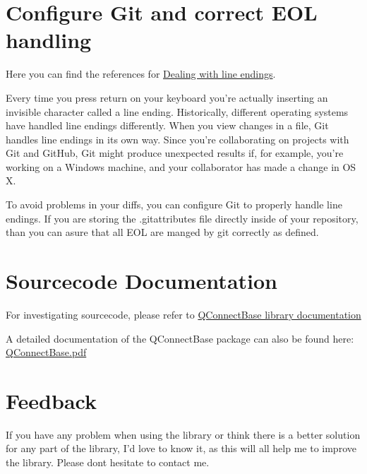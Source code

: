 \hypertarget{description-configure-git-and-correct-eol-handling}{%
\section{Configure Git and correct EOL
handling}\label{description-configure-git-and-correct-eol-handling}}

Here you can find the references for
\href{https://help.github.com/articles/dealing-with-line-endings/}{Dealing
with line endings}.

Every time you press return on your keyboard you're actually inserting
an invisible character called a line ending. Historically, different
operating systems have handled line endings differently. When you view
changes in a file, Git handles line endings in its own way. Since you're
collaborating on projects with Git and GitHub, Git might produce
unexpected results if, for example, you're working on a Windows machine,
and your collaborator has made a change in OS X.

To avoid problems in your diffs, you can configure Git to properly
handle line endings. If you are storing the .gitattributes file directly
inside of your repository, than you can asure that all EOL are manged by
git correctly as defined.

\hypertarget{description-sourcecode-documentation}{%
\section{Sourcecode Documentation}\label{description-sourcecode-documentation}}

For investigating sourcecode, please refer to
\href{docs/html/index.html}{QConnectBase library documentation}

A detailed documentation of the QConnectBase package can also be found
here:
\href{https://github.com/test-fullautomation/robotframework-qconnect-base/blob/develop/QConnectBase/QConnectBase.pdf}{QConnectBase.pdf}

\hypertarget{description-feedback}{%
\section{Feedback}\label{description-feedback}}

If you have any problem when using the library or think there is a
better solution for any part of the library, I'd love to know it, as
this will all help me to improve the library. Please
don\textquotesingle t hesitate to contact me.

